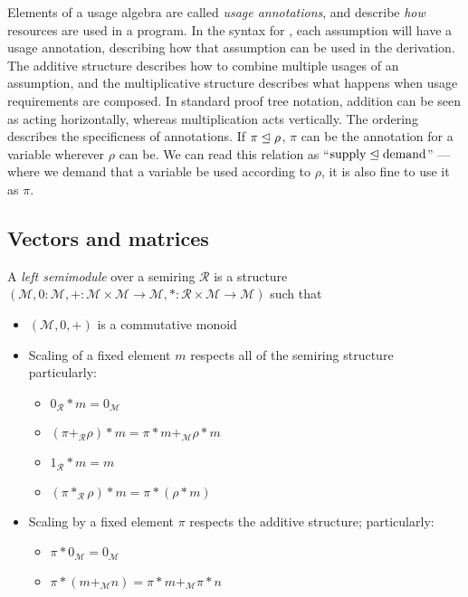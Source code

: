 \documentclass[acmsmall,review]{acmart}
\begin{document}
Elements of a usage algebra are called \emph{usage annotations}, and describe
\emph{how} resources are used in a program.
In the syntax for \name, each assumption will have a usage annotation,
describing how that assumption can be used in the derivation.
The additive structure describes how to combine multiple usages of an
assumption, and the multiplicative structure describes what happens when usage
requirements are composed.
In standard proof tree notation, addition can be seen as acting horizontally,
whereas multiplication acts vertically.
The ordering describes the specificness of annotations.
If $\pi \trianglelefteq \rho$, $\pi$ can be the annotation for a variable wherever
$\rho$ can be.
We can read this relation as ``$\textrm{supply} \trianglelefteq \textrm{demand}$'' ---
where we demand that a variable be used according to $\rho$, it is also fine to
use it as $\pi$.

\subsection{Vectors and matrices}

\begin{definition}
  A \emph{left semimodule} over a semiring $\mathscr R$ is a structure
  $(\mathscr M, 0 : \mathscr M, + : \mathscr M \times \mathscr M \to \mathscr M,
  * : \mathscr R \times \mathscr M \to \mathscr M)$ such that
  \begin{itemize}
  \item $(\mathscr M, 0, +)$ is a commutative monoid
  \item Scaling of a fixed element $m$ respects all of the semiring structure
    particularly:
    \begin{itemize}
    \item $0_\mathscr R * m = 0_\mathscr M$
    \item $(\pi +_\mathscr R \rho) * m = \pi * m +_\mathscr M \rho * m$
    \item $1_\mathscr R * m = m$
    \item $(\pi *_\mathscr R \rho) * m = \pi * (\rho * m)$
    \end{itemize}
  \item Scaling by a fixed element $\pi$ respects the additive structure;
    particularly:
    \begin{itemize}
    \item $\pi * 0_\mathscr M = 0_\mathscr M$
    \item $\pi * (m +_\mathscr M n) = \pi * m +_\mathscr M \pi * n$
    \end{itemize}
  \end{itemize}
\end{definition}
\end{document}
